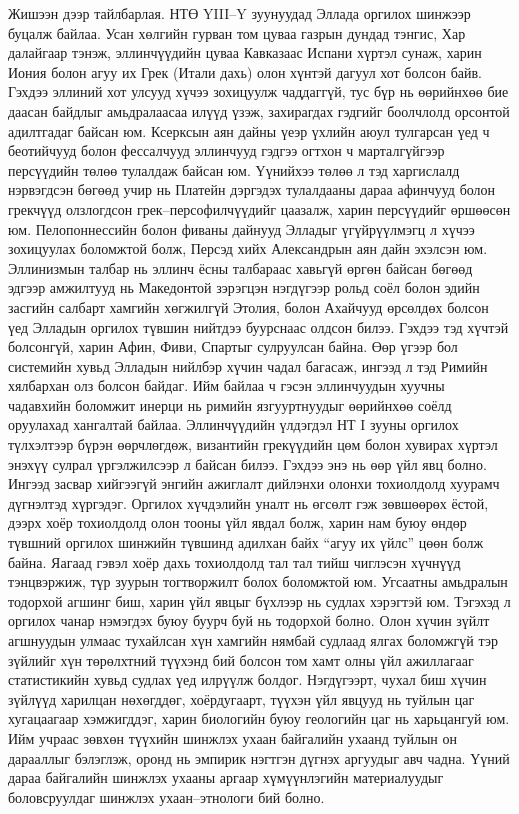 Жишээн дээр тайлбарлая. НТӨ YIII–Y зуунуудад Эллада оргилох шинжээр буцалж байлаа. Усан хөлгийн гурван том цуваа газрын дундад тэнгис, Хар далайгаар тэнэж, эллинчүүдийн цуваа Кавказаас Испани хүртэл сунаж, харин Иония болон агуу их Грек (Итали дахь) олон хүнтэй дагуул хот болсон байв. Гэхдээ эллиний хот улсууд хүчээ зохицуулж чаддаггүй, тус бүр нь өөрийнхөө бие даасан байдлыг амьдралаасаа илүүд үзэж, захирагдах гэдгийг боолчлолд орсонтой адилтгадаг байсан юм. Ксерксын аян дайны үеэр үхлийн аюул тулгарсан үед ч беотийчууд болон фессалчууд эллинчууд гэдгээ огтхон ч марталгүйгээр персүүдийн төлөө тулалдаж байсан юм. Үүнийхээ төлөө л тэд харгислалд нэрвэгдсэн бөгөөд учир нь Платейн дэргэдэх тулалдааны дараа афинчууд болон грекчүүд олзлогдсон грек–персофилчүүдийг цаазалж, харин персүүдийг өршөөсөн юм.
Пелопоннессийн болон фиваны дайнууд Элладыг үгүйрүүлмэгц л хүчээ зохицуулах боломжтой болж, Персэд хийх Александрын аян дайн эхэлсэн юм. Эллинизмын талбар нь эллинч ёсны талбараас хавьгүй өргөн байсан бөгөөд эдгээр амжилтууд нь Македонтой зэрэгцэн нэгдүгээр рольд соёл болон эдийн засгийн салбарт хамгийн хөгжилгүй Этолия, болон Ахайчууд өрсөлдөх болсон үед Элладын оргилох түвшин нийтдээ буурснаас олдсон билээ. Гэхдээ тэд хүчтэй болсонгүй, харин Афин, Фиви, Спартыг сулруулсан байна. Өөр үгээр бол системийн хувьд Элладын нийлбэр хүчин чадал багасаж, ингээд л тэд Римийн хялбархан олз болсон байдаг. Ийм байлаа ч гэсэн эллинчуудын хуучны чадавхийн боломжит инерци нь римийн язгууртнуудыг өөрийнхөө соёлд оруулахад хангалтай байлаа. Эллинчүүдийн үлдэгдэл НТ I зууны оргилох түлхэлтээр бүрэн өөрчлөгдөж, византийн грекүүдийн цөм болон хувирах хүртэл энэхүү сулрал үргэлжилсээр л байсан билээ. Гэхдээ энэ нь өөр үйл явц болно.
Ингээд засвар хийгээгүй энгийн ажиглалт дийлэнхи олонхи тохиолдолд хуурамч дүгнэлтэд хүргэдэг. Оргилох хүчдэлийн уналт нь өгсөлт гэж зөвшөөрөх ёстой, дээрх хоёр тохиолдолд олон тооны үйл явдал болж, харин нам буюу өндөр түвшний оргилох шинжийн түвшинд адилхан байх “агуу их үйлс” цөөн болж байна. Яагаад гэвэл хоёр дахь тохиолдолд тал тал тийш чиглэсэн хүчнүүд тэнцвэржиж, түр зуурын тогтворжилт болох боломжтой юм. Угсаатны амьдралын тодорхой агшинг биш, харин үйл явцыг бүхлээр нь судлах хэрэгтэй юм. Тэгэхэд л оргилох чанар нэмэгдэх буюу буурч буй нь тодорхой болно.
Олон хүчин зүйлт агшнуудын улмаас тухайлсан хүн хамгийн нямбай судлаад ялгах боломжгүй тэр зүйлийг хүн төрөлхтний түүхэнд бий болсон том хамт олны үйл ажиллагааг статистикийн хувьд судлах үед илрүүлж болдог. Нэгдүгээрт, чухал биш хүчин зүйлүүд харилцан нөхөгддөг, хоёрдугаарт, түүхэн үйл явцууд нь туйлын цаг хугацаагаар хэмжигддэг, харин биологийн буюу геологийн цаг нь харьцангуй юм. Ийм учраас зөвхөн түүхийн шинжлэх ухаан байгалийн ухаанд туйлын он дарааллыг бэлэглэж, оронд нь эмпирик нэгтгэн дүгнэх аргуудыг авч чадна. Үүний дараа байгалийн шинжлэх ухааны аргаар хүмүүнлэгийн материалуудыг боловсруулдаг шинжлэх ухаан–этнологи бий болно.

